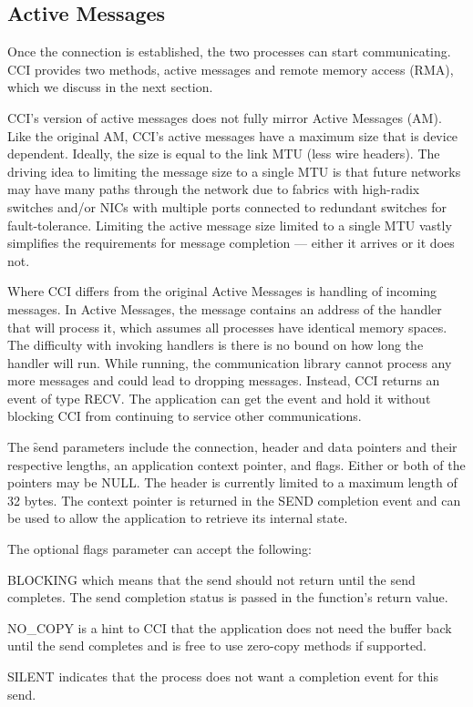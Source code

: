 \documentclass[conference]{IEEEtran}
\begin{document}
\subsection{Active Messages}
Once the connection is established, the two processes can start communicating. CCI
provides two methods, active messages and remote memory access (RMA), which we discuss in
the next section.

CCI's version of active messages does not fully mirror Active Messages\cite{am} (AM). Like
the original AM, CCI's active messages have a maximum size that is device dependent.
Ideally, the size is equal to the link MTU (less wire headers). The driving idea to
limiting the message size to a single MTU is that future networks may have many paths
through the network due to fabrics with high-radix switches and/or NICs with multiple
ports connected to redundant switches for fault-tolerance.  Limiting the active message
size limited to a single MTU vastly simplifies the requirements for message completion ---
either it arrives or it does not.

Where CCI differs from the original Active Messages is handling of incoming messages.  In
Active Messages, the message contains an address of the handler that will process it,
which assumes all processes have identical memory spaces.  The difficulty with invoking
handlers is there is no bound on how long the handler will run.  While running, the
communication library cannot process any more messages and could lead to dropping
messages. Instead, CCI returns an event of type RECV. The application can get the event
and hold it without blocking CCI from continuing to service other communications.

The \f{send} parameters include the connection, header and data pointers and their
respective lengths, an application context pointer, and flags. Either or both of the
pointers may be NULL. The header is currently limited to a maximum length of 32 bytes. The
context pointer is returned in the SEND completion event and can be used to allow the
application to retrieve its internal state.

The optional flags parameter can accept the following:

\begin{description}
\item BLOCKING which means that the send should not return until the send
completes. The send completion status is passed in the function's return value.
\item NO\_COPY is a hint to CCI that the application does not need the buffer
back until the send completes and is free to use zero-copy methods if supported.
\item SILENT indicates that the process does not want a completion event for this
send.
\end{description}
\end{document}
